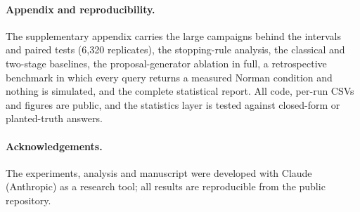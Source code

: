 \documentclass[10pt]{article}
\begin{document}
\paragraph{Appendix and reproducibility.} The supplementary appendix carries
the large campaigns behind the intervals and paired tests (6{,}320 replicates),
the stopping-rule analysis, the classical and two-stage baselines, the
proposal-generator ablation in full, a retrospective benchmark in which every
query returns a measured Norman condition and nothing is simulated, and the
complete statistical report. All code, per-run CSVs and figures are public, and
the statistics layer is tested against closed-form or planted-truth answers.

\paragraph{Acknowledgements.} The experiments, analysis and manuscript were
developed with Claude (Anthropic) as a research tool; all results are
reproducible from the public repository.



\end{document}
